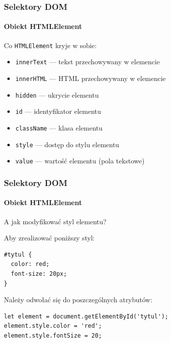 \begin{frame}[fragile]
  \frametitle{Selektory DOM}
  \framesubtitle{Obiekt HTMLElement}

  Co \verb|HTMLElement| kryje w sobie:

  \begin{itemize}
    \item \verb|innerText| --- tekst przechowywany w elemencie
    \item \verb|innerHTML| --- HTML przechowywany w elemencie
    \item \verb|hidden| --- ukrycie elementu
    \item \verb|id| --- identyfikator elementu
    \item \verb|className| --- klasa elementu
    \item \verb|style| --- dostęp do stylu elementu
    \item \verb|value| --- wartość elementu (pola tekstowe)
  \end{itemize}

\end{frame}


\begin{frame}[fragile]
  \frametitle{Selektory DOM}
  \framesubtitle{Obiekt HTMLElement}

  A jak modyfikować styl elementu?

  Aby zrealizować poniższy styl:
  \begin{verbatim}
#tytul {
  color: red;
  font-size: 20px;
}
  \end{verbatim}

Należy odwołać się do poszczególnych atrybutów:
  \begin{verbatim}
let element = document.getElementById('tytul');
element.style.color = 'red';
element.style.fontSize = 20;
  \end{verbatim}

\end{frame}








